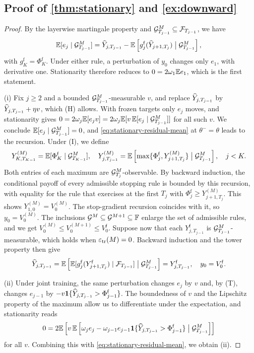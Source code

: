 \subsection{Proof of \texorpdfstring{\cref{thm:stationary}}{Theorem 8} and \texorpdfstring{\cref{ex:downward}}{Example 9}}\label{app:stationary}

\begin{proof}

By the layerwise martingale property and $\mathcal{G}^{M}_{T_{j-1}}\subseteq\mathcal{F}_{T_{j-1}}$, we have
\begin{equation}\label{eq:stationary-residual-mean}
\mathbb{E}[e_j\mid\mathcal{G}^{M}_{T_{j-1}}]=\widehat Y_{j,T_{j-1}}-\mathbb{E}\left[g^{\mathrm f}_j(\widehat Y_{j+1,T_j})\bigm|\mathcal{G}^{M}_{T_{j-1}}\right],
\end{equation}
with $g^{\mathrm f}_K=\Phi^{\mathrm f}_K$. Under either rule, a perturbation of $y_0$ changes only $e_1$, with derivative one. Stationarity therefore reduces to $0=2\omega_1\mathbb{E} e_1$, which is the first statement.

(i) Fix $j\ge2$ and a bounded $\mathcal{G}^{M}_{T_{j-1}}$-measurable $v$, and replace $\widehat Y_{j,T_{j-1}}$ by $\widehat Y_{j,T_{j-1}}+\eta v$, which (H) allows. With frozen targets only $e_j$ moves, and stationarity gives $0=2\omega_j\mathbb{E}[e_jv]=2\omega_j\mathbb{E}[v\,\mathbb{E}[e_j\mid\mathcal{G}^{M}_{T_{j-1}}]]$ for all such $v$. We conclude $\mathbb{E}[e_j\mid\mathcal{G}^{M}_{T_{j-1}}]=0$, and \eqref{eq:stationary-residual-mean} at $\theta^-=\theta$ leads to the recursion. Under (I), we define
\[
Y^{(M)}_{K,T_{K-1}}=\mathbb{E}[\Phi^{\mathrm f}_K\mid\mathcal{G}^{M}_{T_{K-1}}],\quad
Y^{(M)}_{j,T_{j-1}}=\mathbb{E}\left[\max\{\Phi^{\mathrm f}_j,Y^{(M)}_{j+1,T_j}\}\bigm|\mathcal{G}^{M}_{T_{j-1}}\right],\quad j<K .
\]
Both entries of each maximum are $\mathcal{G}^{M}_{T_j}$-observable. By backward induction, the conditional payoff of every admissible stopping rule is bounded by this recursion, with equality for the rule that exercises at the first $T_j$ with $\Phi^{\mathrm f}_j\ge Y^{(M)}_{j+1,T_j}$. This shows $Y^{(M)}_{1,0}=V^{(M)}_0$. The stop-gradient recursion coincides with it, so $y_0=V^{(M)}_0$. The inclusions $\mathcal{G}^{M}\subseteq\mathcal{G}^{M+1}\subseteq\mathbb{F}$ enlarge the set of admissible rules, and we get $V^{(M)}_0\le V^{(M+1)}_0\le V^{\mathrm f}_0$. Suppose now that each $Y^{\mathrm f}_{j,T_{j-1}}$ is $\mathcal{G}^{M}_{T_{j-1}}$-measurable, which holds when $\varepsilon_{\mathrm{tr}}(M)=0$. Backward induction and the tower property then give
\[
\widehat Y_{j,T_{j-1}}=\mathbb{E}\left[\mathbb{E}[g^{\mathrm f}_j(Y^{\mathrm f}_{j+1,T_j})\mid\mathcal{F}_{T_{j-1}}]\bigm|\mathcal{G}^{M}_{T_{j-1}}\right]=Y^{\mathrm f}_{j,T_{j-1}},\quad y_0=V^{\mathrm f}_0 .
\]

(ii) Under joint training, the same perturbation changes $e_j$ by $v$ and, by (T), changes $e_{j-1}$ by $-v\mathbf{1}\{\widehat Y_{j,T_{j-1}}>\Phi^{\mathrm f}_{j-1}\}$. The boundedness of $v$ and the Lipschitz property of the maximum allow us to differentiate under the expectation, and stationarity reads
\[
0=2\mathbb{E}\left[v\,\mathbb{E}\left[\omega_je_j-\omega_{j-1}e_{j-1}\mathbf{1}\{\widehat Y_{j,T_{j-1}}>\Phi^{\mathrm f}_{j-1}\}\bigm|\mathcal{G}^{M}_{T_{j-1}}\right]\right]
\]
for all $v$. Combining this with \eqref{eq:stationary-residual-mean}, we obtain (ii).


\end{proof}
